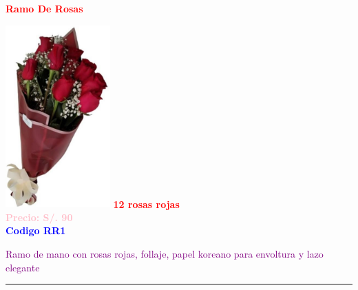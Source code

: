     \begin{center}
        \textbf{\Huge\textcolor{red}{Ramo De Rosas}}
    \end{center}
    \begin{multicols}{2}

    \begin{minipage}{\linewidth}
        \centering
        \includegraphics[height=7cm]{imagenes_extraidas/image_6_1} %
        \newline
        \vspace{0.1cm}
        \textbf{\Large \textcolor{red}{12 rosas rojas}} \\ %
        \vspace{0.2cm}
        \textbf{\textcolor{pink}{Precio: S/. 90}} \\ %
        \vspace{0.2cm}
        \textbf{\textcolor{blue}{Codigo RR1}} \\ %
        \vspace{0.2cm}
        \begin{minipage}{0.8\linewidth} 
            \small \textcolor{purple}{Ramo de mano con rosas rojas, follaje, papel koreano para envoltura y lazo elegante} %
        \end{minipage}
        \vspace{0.1cm}        
        \rule{\linewidth}{0.5pt}
    \end{minipage}
    

\end{multicols}
